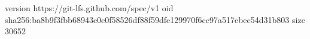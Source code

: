 version https://git-lfs.github.com/spec/v1
oid sha256:ba8b9f3fbb68943e0c0f58526df88f59dfe129970f6cc97a517ebec54d31b803
size 30652
